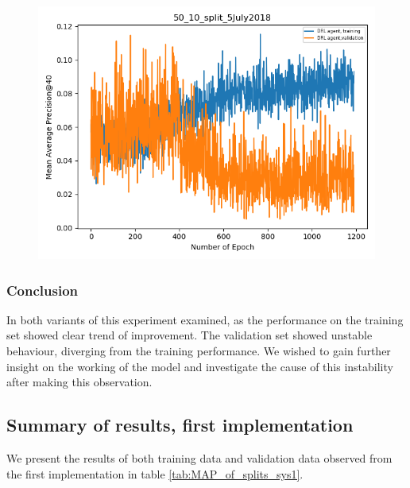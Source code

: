 \begin{figure}[H]
	\centering
	\includegraphics[width=0.8\linewidth]{images/chapter_4/50-10}
	\caption{}
	\label{fig:50-10}
\end{figure}


\subsubsection{Conclusion}

In both variants of this experiment examined, as the performance on the training set showed clear trend of improvement. The validation set showed unstable behaviour, diverging from the training performance.  We wished to gain further insight on the working of the model and investigate the cause of this instability after making this observation.



\subsection{Summary of results, first implementation}

We present the results of both training data and validation data observed from the first implementation in table \ref{tab:MAP_of_splits_sys1}.


